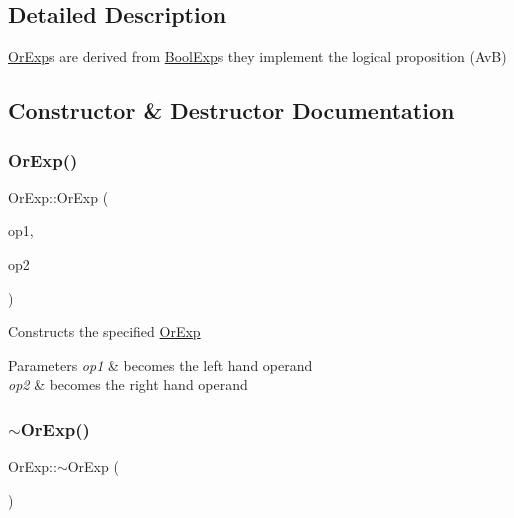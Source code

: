 \subsection{Detailed Description}
\mbox{\hyperlink{classOrExp}{Or\+Exp}}\textquotesingle{}s are derived from \mbox{\hyperlink{classBoolExp}{Bool\+Exp}}\textquotesingle{}s they implement the logical proposition (AvB) 

\subsection{Constructor \& Destructor Documentation}
\mbox{\label{classOrExp_a600a2b33932bd7e8ea4011180a9ae791}} 
\subsubsection{\texorpdfstring{Or\+Exp()}{OrExp()}}
{\footnotesize\ttfamily Or\+Exp\+::\+Or\+Exp (\begin{DoxyParamCaption}\item[{shared\+\_\+ptr$<$ \mbox{\hyperlink{classBoolExp}{Bool\+Exp}} $>$}]{op1,  }\item[{shared\+\_\+ptr$<$ \mbox{\hyperlink{classBoolExp}{Bool\+Exp}} $>$}]{op2 }\end{DoxyParamCaption})}

Constructs the specified \mbox{\hyperlink{classOrExp}{Or\+Exp}} 
\begin{DoxyParams}{Parameters}
{\em op1} & becomes the left hand operand \\
\hline
{\em op2} & becomes the right hand operand \\
\hline
\end{DoxyParams}
\mbox{\label{classOrExp_a13e824ccc65f06421b506a3428d73ca5}} 
\subsubsection{\texorpdfstring{$\sim$\+Or\+Exp()}{~OrExp()}}
{\footnotesize\ttfamily Or\+Exp\+::$\sim$\+Or\+Exp (\begin{DoxyParamCaption}{ }\end{DoxyParamCaption})\hspace{0.3cm}{\ttfamily [virtual]}}

